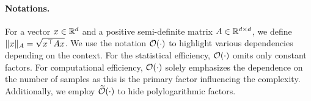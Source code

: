 \paragraph{Notations.} For a vector $x \in \mathbb{R}^d$ and a positive semi-definite matrix $A \in \mathbb{R}^{d \times d}$, we define $\lVert x\rVert_A = \sqrt{x^\top A x}$. We use the notation $\mathcal{O}(\cdot)$ to highlight various dependencies depending on the context. For the statistical efficiency, $\mathcal{O}(\cdot)$ omits only constant factors. For computational efficiency, $\mathcal{O}(\cdot)$ solely emphasizes the dependence on the number of samples as this is the primary factor influencing the complexity. Additionally, we employ $\widetilde{\mathcal{O}}(\cdot)$ to hide polylogarithmic factors.


